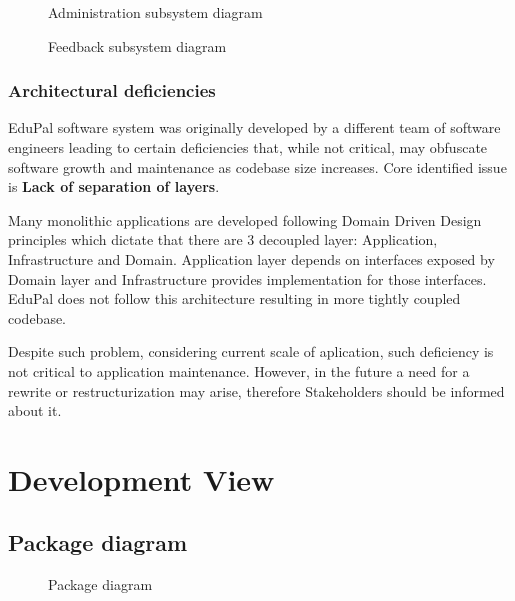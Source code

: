 \documentclass[
    english, %
]{VUMIFPSkursinis}
\begin{document}
\begin{figure}[ht]
    \centering
    
    \caption{Administration subsystem diagram}
    \label{administration-model}
\end{figure}

\begin{figure}[ht]
    \centering
    
    \caption{Feedback subsystem diagram}
    \label{feedback-model}
\end{figure}

\subsubsection{Architectural deficiencies}

EduPal software system was originally developed by a different team of software engineers leading to certain deficiencies that, while not critical, may obfuscate software growth and maintenance as codebase size increases. Core identified issue is \textbf{Lack of separation of layers}.

Many monolithic applications are developed following Domain Driven Design principles which dictate that there are 3 decoupled layer: Application, Infrastructure and Domain. Application layer depends on interfaces exposed by Domain layer and Infrastructure provides implementation for those interfaces. EduPal does not follow this architecture resulting in more tightly coupled codebase.

Despite such problem, considering current scale of aplication, such deficiency is not critical to application maintenance. However, in the future a need for a rewrite or restructurization may arise, therefore Stakeholders should be informed about it.

\section{Development View}

\subsection{Package diagram}

\begin{figure}[ht]
    \centering
    
    \caption{Package diagram}
    \label{package-diagram}
\end{figure}
\end{document}
